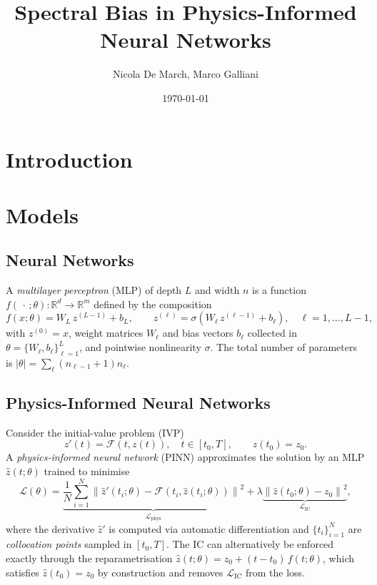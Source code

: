 \documentclass{article}
\title{Spectral Bias in Physics-Informed Neural Networks}
\author{Nicola De March, Marco Galliani}
\date{\today}
\begin{document}
\maketitle

\begin{abstract}

\end{abstract}

\section{Introduction}


\section{Models}

\subsection{Neural Networks}

A \emph{multilayer perceptron} (MLP) of depth $L$ and width $n$ is a function
$f(\,\cdot\,;\theta):\mathbb{R}^{d}\to\mathbb{R}^{m}$ defined by the
composition
\begin{equation}
    f(x;\theta)
    = W_{L}\,z^{(L-1)}+b_{L},
    \qquad
    z^{(\ell)} = \sigma\!\left(W_{\ell}\,z^{(\ell-1)}+b_{\ell}\right),
    \quad \ell=1,\ldots,L-1,
\end{equation}
with $z^{(0)}=x$, weight matrices $W_{\ell}$ and bias vectors $b_{\ell}$
collected in $\theta=\{W_{\ell},b_{\ell}\}_{\ell=1}^{L}$, and pointwise
nonlinearity $\sigma$.  The total number of parameters is
$|\theta|=\sum_{\ell}(n_{\ell-1}+1)n_{\ell}$.

\subsection{Physics-Informed Neural Networks}

Consider the initial-value problem (IVP)
\begin{equation}
    z'(t)=\mathcal{F}(t,z(t)),\quad t\in[t_0,T],\qquad z(t_0)=z_0.
\end{equation}
A \emph{physics-informed neural network} (PINN) \cite{raissi2019} approximates
the solution by an MLP $\hat{z}(t;\theta)$ trained to minimise
\begin{equation}
    \mathcal{L}(\theta)
    = \underbrace{\frac{1}{N}\sum_{i=1}^{N}
        \left\|\hat{z}'(t_i;\theta)-\mathcal{F}(t_i,\hat{z}(t_i;\theta))\right\|^{2}}_{\mathcal{L}_{\mathrm{phys}}}
    + \lambda\underbrace{\left\|\hat{z}(t_0;\theta)-z_0\right\|^{2}}_{\mathcal{L}_{\mathrm{IC}}},
\end{equation}
where the derivative $\hat{z}'$ is computed via automatic differentiation and
$\{t_i\}_{i=1}^{N}$ are \emph{collocation points} sampled in $[t_0,T]$.
The IC can alternatively be enforced exactly through the reparametrisation
$\hat{z}(t;\theta) = z_0 + (t-t_0)\,f(t;\theta)$, which satisfies
$\hat{z}(t_0)=z_0$ by construction and removes $\mathcal{L}_{\mathrm{IC}}$
from the loss.
\end{document}
